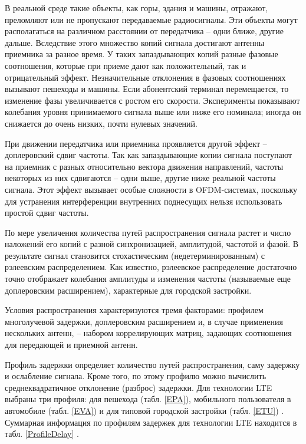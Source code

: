 В реальной среде такие объекты, как горы, здания и машины, отражают, преломляют или не пропускают передаваемые радиосигналы. Эти объекты могут располагаться на различном расстоянии от передатчика – одни ближе, другие дальше. Вследствие этого множество копий сигнала достигают антенны приемника за разное время. У таких запаздывающих копий разные фазовые соотношения, которые при приеме дают как положительный, так и отрицательный эффект. Незначительные отклонения в фазовых соотношениях вызывают пешеходы и машины. Если абонентский терминал перемещается, то изменение фазы увеличивается с ростом его скорости.
Эксперименты показывают колебания уровня принимаемого сигнала выше или ниже его номинала; иногда он снижается до очень низких, почти нулевых значений.

При движении передатчика или приемника проявляется другой эффект – доплеровский сдвиг частоты. Так как запаздывающие копии сигнала поступают на приемник с разных относительно вектора движения направлений, частоты некоторых из них сдвигаются – одни выше, другие ниже реальной частоты сигнала. Этот эффект вызывает особые сложности в OFDM-системах, поскольку для устранения интерференции внутренних поднесущих нельзя использовать простой сдвиг частоты.

По мере увеличения количества путей распространения сигнала растет и число наложений его копий с разной синхронизацией, амплитудой, частотой и фазой. В результате сигнал становится стохастическим (недетерминированным) с рэлеевским распределением. Как известно, рэлеевское распределение достаточно точно отображает колебания амплитуды и изменения частоты (называемые еще доплеровским расширением), характерные для городской застройки.

Условия распространения характеризуются тремя факторами: профилем многолучевой задержки, доплеровским расширением и, в случае применения нескольких антенн, – набором коррелирующих матриц, задающих соотношения для передающей и приемной антенн.

Профиль задержки определяет количество путей распространения, саму задержку и ослабление сигнала. 
Кроме того, по этому профилю можно вычислить среднеквадратичное отклонение (разброс) задержки. 
Для технологии LTE выбраны три профиля: для пешехода (табл. \ref{EPA}), мобильного пользователя в автомобиле (табл. \ref{EVA}) и для типовой городской застройки (табл. \ref{ETU}) \cite{TS36104}. 
Суммарная информация по профилям задержек для технологии LTE находится в табл. \ref{ProfileDelay} \cite{iks}.


